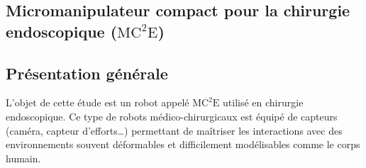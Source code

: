 \documentclass[10pt,fleqn]{article} %
\begin{document}

\vspace{4cm}
\pagestyle{fancy}
\thispagestyle{plain}

\def\columnseprulecolor{\color{ocre}}
\setlength{\columnseprule}{0.4pt} 

\begin{multicols}{2}
\section{Micromanipulateur compact pour la chirurgie endoscopique ($\text{MC}^2\text{E}$)}
\subsection{Présentation générale}
L’objet de cette étude est un robot appelé $\text{MC}^2\text{E}$ utilisé en chirurgie endoscopique. Ce type de
robots médico-chirurgicaux est équipé de capteurs (caméra, capteur d’efforts…) permettant de maîtriser
les interactions avec des environnements souvent déformables et difficilement modélisables comme le
corps humain.
%



\end{multicols}
\end{document}
